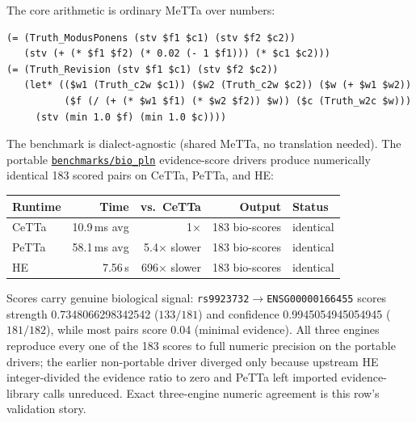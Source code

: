 \documentclass[11pt]{article}
\newcommand{\code}[1]{\texttt{#1}}
\newcommand{\PeTTa}{\textup{PeTTa}}
\newcommand{\HE}{\textup{HE}}
\newcommand{\CeTTa}{\textup{CeTTa}}
\begin{document}
The core arithmetic is ordinary MeTTa over numbers:
\begin{lstlisting}[language={},basicstyle=\ttfamily\scriptsize]
(= (Truth_ModusPonens (stv $f1 $c1) (stv $f2 $c2))
   (stv (+ (* $f1 $f2) (* 0.02 (- 1 $f1))) (* $c1 $c2)))
(= (Truth_Revision (stv $f1 $c1) (stv $f2 $c2))
   (let* (($w1 (Truth_c2w $c1)) ($w2 (Truth_c2w $c2)) ($w (+ $w1 $w2))
          ($f (/ (+ (* $w1 $f1) (* $w2 $f2)) $w)) ($c (Truth_w2c $w)))
     (stv (min 1.0 $f) (min 1.0 $c))))
\end{lstlisting}
The benchmark is dialect-agnostic (shared MeTTa, no translation
needed).  The portable
\href{https://github.com/zariuq/CeTTa/tree/07928677c0237a19b2f3c32dffca28d7d2626723/benchmarks/bio_pln}{\code{benchmarks/bio\_pln}}
evidence-score drivers produce numerically identical
183 scored pairs on \CeTTa{}, \PeTTa{}, and \HE{}:

\begin{center}
\begin{tabular}{lrrrl}
\toprule
Runtime & Time & vs.\ \CeTTa{} & Output & Status \\
\midrule
\CeTTa{} & 10.9\,ms avg & 1$\times$ & 183 bio-scores & identical \\
\PeTTa{} & 58.1\,ms avg  & 5.4$\times$ slower & 183 bio-scores & identical \\
\HE{}    & 7.56\,s     & 696$\times$ slower & 183 bio-scores & identical \\
\bottomrule
\end{tabular}
\end{center}

Scores carry genuine biological signal:
\code{rs9923732}$\to$\code{ENSG00000166455} scores strength
0.7348066298342542 ($133/181$) and confidence 0.9945054945054945
($181/182$), while most pairs score 0.04 (minimal evidence).  All three
engines reproduce every one of the 183 scores to full numeric
precision on the portable drivers; the earlier non-portable driver
diverged only because upstream \HE{} integer-divided the evidence ratio
to zero and \PeTTa{} left imported evidence-library calls unreduced.
Exact three-engine numeric agreement is this row's validation story.
\end{document}
